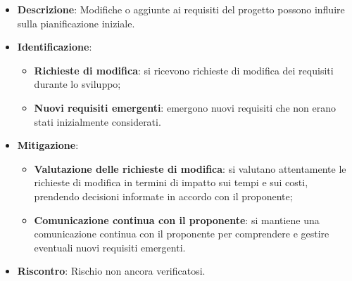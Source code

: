 \label{risk:cambiamenti nei requisiti}
\begin{itemize}
	\item \textbf{Descrizione}:
			Modifiche o aggiunte ai requisiti del progetto possono influire 
			sulla pianificazione iniziale.
	\item \textbf{Identificazione}:
	      \begin{itemize}
		      \item \textbf{Richieste di modifica}: si ricevono richieste di modifica 
			  		dei requisiti durante lo sviluppo;

			  \item \textbf{Nuovi requisiti emergenti}: emergono nuovi requisiti che 
			  		non erano stati inizialmente considerati.
			  
	      \end{itemize}
	\item \textbf{Mitigazione}:
	      \begin{itemize}
		      \item \textbf{Valutazione delle richieste di modifica}: si valutano 
			  		attentamente le richieste di modifica in termini di impatto 
					sui tempi e sui costi, prendendo decisioni informate in 
					accordo con il proponente;

		      \item \textbf{Comunicazione continua con il proponente}: si mantiene 
			  		una comunicazione continua con il proponente per comprendere 
					e gestire eventuali nuovi requisiti emergenti.
	      \end{itemize}
		  
	\item \textbf{Riscontro}: Rischio non ancora verificatosi.
\end{itemize}
